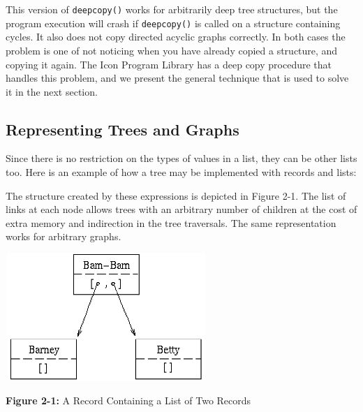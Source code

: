 This version of \texttt{deepcopy()} works for
arbitrarily deep tree structures, but the program execution
will crash if \texttt{deepcopy()} is called on a structure containing
cycles. It also does not copy directed acyclic graphs correctly. In
both cases the problem is one of not noticing when you have already
copied a structure, and copying it again. The Icon Program Library has
a deep copy procedure that handles this problem, and we present the
general technique that is used to solve it in the next section.

\subsection*{Representing Trees and Graphs}

Since there is no restriction on the types of values in a list, they can
be other lists too. Here is an example of how a tree may be implemented
with records and lists:


The structure created by these expressions is depicted in Figure 2-1.
The list of links at each node allows trees with an arbitrary number of
children at the cost of extra memory and indirection in the tree
traversals. The same representation works for arbitrary
graphs.



\begin{center}
\includegraphics[width=3in,height=1.9in]{ub-img/ub-img6.png}
\end{center}

{\sffamily\bfseries Figure 2-1:}
{\sffamily A Record Containing a List of Two Records}

